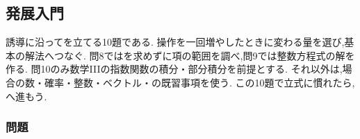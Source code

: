     \subsection{発展入門}\label{節：発展入門}
      誘導に沿ってを立てる10題である.
                操作を一回増やしたときに変わる量を選び,基本の解法へつなぐ.
      問8ではを求めずに項の範囲を調べ,問9では整数方程式の解を作る.
      問10のみ数学IIIの指数関数の積分・部分積分を前提とする.
      それ以外は,場合の数・確率・整数・ベクトル・の既習事項を使う.
      この10題で立式に慣れたら,へ進もう.

      \subsubsection{問題}\label{節：発展入門：問題}
